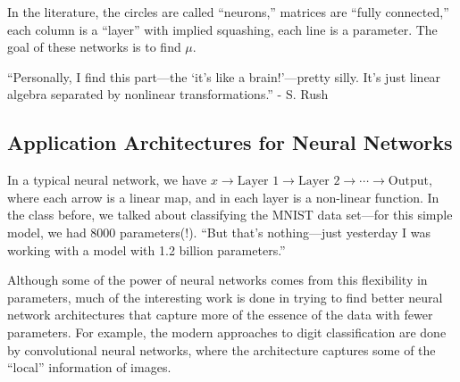 \documentclass{article}
\begin{document}
In the literature, the circles are called ``neurons,'' matrices are ``fully connected,'' each column is a ``layer'' with implied squashing, each line is a parameter. The goal of these networks is to find $\mu$.

``Personally, I find this part---the `it's like a brain!'---pretty silly. It's just linear algebra separated by nonlinear transformations.'' - S. Rush

\subsection{Application Architectures for Neural Networks}

In a typical neural network, we have $x\to\text{Layer 1}\to\text{Layer 2}\to\cdots\to\text{Output}$, where each arrow is a linear map, and in each layer is a non-linear function. In the class before, we talked about classifying the MNIST data set---for this simple model, we had 8000 parameters(!). ``But that's nothing---just yesterday I was working with a model with 1.2 billion parameters.''

Although some of the power of neural networks comes from this flexibility in parameters, much of the interesting work is done in trying to find better neural network architectures that capture more of the essence of the data with fewer parameters. For example, the modern approaches to digit classification are done by convolutional neural networks, where the architecture captures some of the ``local'' information of images.
\end{document}
